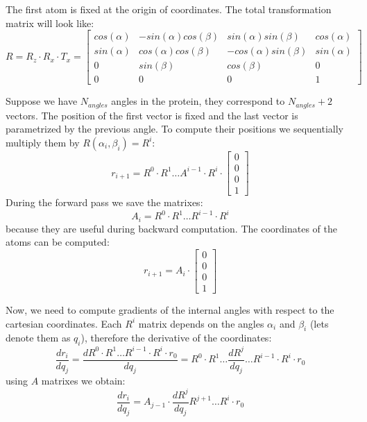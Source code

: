 The first atom is fixed at the origin of coordinates. The total transformation matrix will look like:
$$
R = R_z \cdot R_x \cdot T_x = 
\begin{bmatrix}
cos(\alpha) & -sin(\alpha)cos(\beta) & sin(\alpha)sin(\beta) & cos(\alpha)\\
sin(\alpha) & cos(\alpha)cos(\beta) & -cos(\alpha)sin(\beta) & sin(\alpha)\\
0 & sin(\beta) & cos(\beta) & 0\\
0 & 0 & 0 & 1
\end{bmatrix} 
$$


Suppose we have $N_{angles}$ angles in the protein, they correspond to $N_{angles}+2$ vectors. The position of the first 
vector is fixed and the last vector is parametrized by the previous angle. To compute their positions we
sequentially multiply them by $R(\alpha_i, \beta_i) = R^i$:
$$ r_{i+1} = R^0 \cdot R^1 \dots A^{i-1} \cdot R^{i} \cdot \begin{bmatrix} 0 \\ 0 \\ 0 \\ 1 \end{bmatrix}$$
During the forward pass we save the matrixes:
$$A_i = R^{0} \cdot R^{1} \dots R^{i-1} \cdot R^{i}$$
because they are useful during backward computation. The coordinates of the atoms can be computed:
$$r_{i+1} = A_i \cdot \begin{bmatrix} 0 \\ 0 \\ 0 \\ 1 \end{bmatrix}$$

Now, we need to compute gradients of the internal angles with respect to the cartesian coordinates.
Each $R^{i}$ matrix depends on the angles $\alpha_i$ and $\beta_i$ (lets denote them as $q_i$), 
therefore the derivative of the coordinates:
$$ \frac{dr_i}{dq_j} = \frac{d R^{0} \cdot R^{1} \dots R^{i-1} \cdot R^{i} \cdot r_0} {dq_j} = 
R^{0} \cdot R^{1} \dots \frac{dR^j}{dq_j} \dots R^{i-1} \cdot R^{i} \cdot r_0 $$
using $A$ matrixes we obtain:
$$ \frac{dr_i}{dq_j} = A_{j-1}  \cdot \frac{dR^j}{dq_j} R^{j+1} \dots R^{i} \cdot r_0 $$


